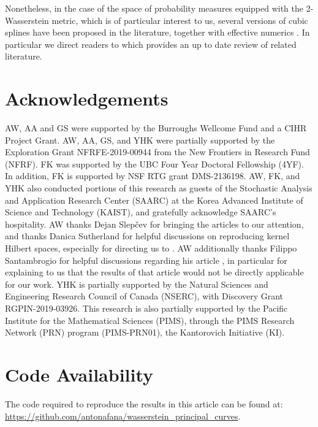 \documentclass[aos, preprint]{imsart}
\theoremstyle{plain}
\theoremstyle{remark}
\begin{document}
Nonetheless, in the case of the space of probability measures equipped
with the 2-Wasserstein metric, which is of particular interest to
us, several versions of cubic splines have been proposed in the literature,
together with effective numerics \cite{banerjee2025efficient, benamou2019second, chen2018measure, chewi2021fast, justiniano2023approximation}. In particular we direct readers to
\cite{justiniano2023approximation} which provides an up to date review of related
literature.

\section*{Acknowledgements}
AW, AA and GS were supported by the Burroughs Wellcome Fund and a CIHR
Project Grant. AW, AA, GS, and YHK were partially supported by the
Exploration Grant NFRFE-2019-00944 from the New Frontiers in Research
Fund (NFRF). FK was supported by the UBC Four Year Doctoral Fellowship
(4YF). In addition, FK is supported by NSF RTG grant DMS-2136198. AW,
FK, and YHK also conducted portions of this research as guests of the
Stochastic Analysis and Application Research Center (SAARC) at the
Korea Advanced Institute of Science and Technology (KAIST), and
gratefully acknowledge SAARC's hospitality. AW thanks Dejan Slepčev
for bringing the articles \cite{lu2016average, kirov2017multiple} to
our attention, and thanks Danica Sutherland for helpful discussions on
reproducing kernel Hilbert spaces, especially for directing us to
\cite{wynne2022kernel}. AW additionally thanks Filippo Santambrogio
for helpful discussions regarding his article
\cite{iacobelli2019weighted}, in particular for explaining to us that
the results of that article would not be directly applicable for our
work. {YHK is partially supported by the Natural Sciences and
  Engineering Research Council of Canada (NSERC), with Discovery Grant
  RGPIN-2019-03926. This research is also partially supported by the
  Pacific Institute for the Mathematical Sciences (PIMS), through the
  PIMS Research Network (PRN) program (PIMS-PRN01), the Kantorovich
  Initiative (KI).
}

\section*{Code Availability} The code required to reproduce the results in this article can be found at: \hyperlink{https://github.com/antonafana/wasserstein\_principal\_curves}{https://github.com/antonafana/wasserstein\_principal\_curves}.
\end{document}
